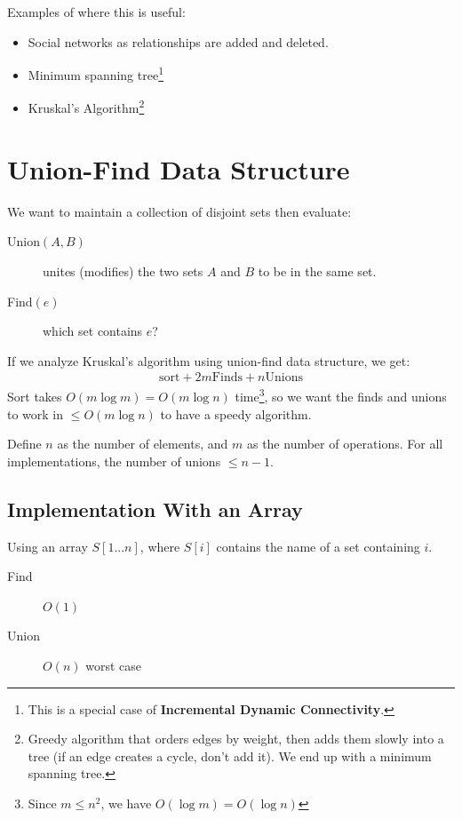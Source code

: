                 Examples of where this is useful:

                \begin{itemize}
                    \item Social networks as relationships are added and deleted.
                    \item Minimum spanning tree\footnote{This is a special case of \textbf{Incremental Dynamic Connectivity}.}
                    \item Kruskal's Algorithm\footnote{
                        Greedy algorithm that orders edges by weight, then adds them slowly into a tree (if an edge creates a cycle, don't add it).
                        We end up with a minimum spanning tree.}
                \end{itemize}
            \section{Union-Find Data Structure} %
            \label{sec:union_find_data_structure}
                We want to maintain a collection of disjoint sets then evaluate:
                \begin{description}
                    \item[Union$(A, B)$] unites (modifies) the two sets $A$ and $B$ to be in the same set.
                    \item[Find$(e)$] which set contains $e$?
                \end{description}

                If we analyze Kruskal's algorithm using union-find data structure, we get:
                \begin{align*}
                    \mbox{sort} + 2m \mbox{Finds} + n \mbox{Unions}
                \end{align*}
                Sort takes $O(m \log m) = O(m \log n)$ time\footnote{Since $m \le n^2$, we have $O(\log m) = O(\log n)$}, so we want the finds and unions to work in $\le O (m \log n)$ to have a speedy algorithm.

                Define $n$ as the number of elements, and $m$ as the number of operations.
                For all implementations, the number of unions $\le n - 1$.
                \subsection{Implementation With an Array} %
                \label{sub:implementation_with_an_array}
                    Using an array $S[1...n]$, where $S[i]$ contains the name of a set containing $i$.
                    \begin{description}
                        \item[Find] $O(1)$
                        \item[Union] $O(n)$ worst case
                    \end{description}

